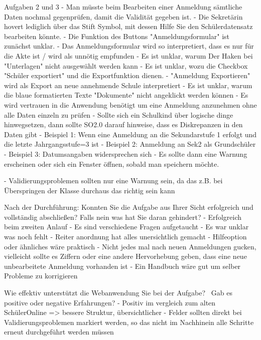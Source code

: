 Aufgaben 2 und 3 
- Man müsste beim Bearbeiten einer Anmeldung sämtliche Daten nochmal gegenprüfen, damit die Validität gegeben ist. 
- Die Sekretärin hovert lediglich über das Stift Symbol, mit dessen Hilfe Sie den Schülerdatensatz bearbeiten könnte.
- Die Funktion des Buttons "Anmeldungsformular" ist zunächst unklar.
- Das Anmeldungsformular wird so interpretiert, dass es nur für die Akte ist / wird als unnötig empfunden
- Es ist unklar, warum Der Haken bei "Unterlagen" nicht ausgewählt werden kann
- Es ist unklar, wozu die Checkbox "Schüler exportiert" und die Exportfunktion dienen. 
- "Anmeldung Exportieren" wird als Export an neue annehmende Schule interpretiert
- Es ist unklar, warum die blaue formatierten Texte "Dokumente" nicht angeklickt werden können
- Es wird vertrauen in die Anwendung benötigt um eine Anmeldung anzunehmen ohne alle Daten einzeln zu prüfen
- Sollte sich ein Schulkind über logische dinge hinwegsetzen, dann sollte SO2.0 darauf hinweise, dass es Diskrepanzen in den Daten gibt 
    - Beispiel 1: Wenn eine Anmeldung an die Sekundarstufe 1 erfolgt und die letzte Jahrgangsstufe=3 ist
    - Beispiel 2: Anmeldung an Sek2 als Grundschüler
    - Beispiel 3: Datumsangaben widersprechen sich
    - Es sollte dann eine Warnung erscheinen oder sich ein Fenster öffnen, sobald man speichern möchte.

- Validierungsproblemen sollten nur eine Warnung sein, da das z.B. bei Überspringen der Klasse durchaus das richtig sein kann









Nach der Durchführung:		
Konnten Sie die Aufgabe aus Ihrer Sicht erfolgreich und vollständig abschließen? Falls nein was hat Sie daran gehindert?	
- Erfolgreich beim zweiten Anlauf
- Es sind verschiedene Fragen aufgetaucht
- Es war unklar was noch fehlt
- Reiter anordnung hat alles unersichtlich gemacht
- Hilfeoption oder ähnliches wäre praktisch
- Nicht jedes mal nach neuen Anmeldungen gucken, vielleicht sollte es Ziffern oder eine andere Hervorhebung geben, dass eine neue unbearbeitete Anmeldung vorhanden ist
- Ein Handbuch wäre gut um selber Probleme zu korrigieren











Wie effektiv unterstützt die Webanwendung Sie bei der Aufgabe?  Gab es positive oder negative Erfahrungen?	
- Positiv im vergleich zum alten SchülerOnline => bessere Struktur, übersichtlicher	
- Felder sollten direkt bei Validierungsproblemen markiert werden, so das nicht im Nachhinein alle Schritte erneut durchgeführt werden müssen










